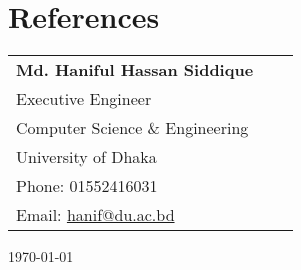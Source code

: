 \documentclass[a4paper]{article}
\begin{document}
\section{References}

\begin{table}[h]
\begin{tabular}{@{}lll@{}}
\textbf{Md. Haniful Hassan Siddique} \\
Executive Engineer\\
Computer Science \& Engineering\\
University of Dhaka\\
Phone: 01552416031\\
Email: \href{mailto:hanif@du.ac.bd}{hanif@du.ac.bd} \\
\end{tabular}
\end{table}

\noindent \today
\end{document}
